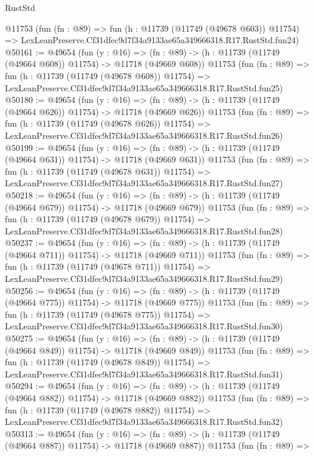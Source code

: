 \begin{lexlean}{RustStd}
\begin{coremodule}
    @11753
    (fun (fn : @89) =>
    fun (h : @11739 (@11749 (@49678 @603)) @11754) =>
    LexLeanPreserve.Cf31dfec9d7f34a9133ae65a349666318.R17.RustStd.fun24)
@50161 := @49654
    (fun (y : @16) =>
    (fn : @89) -> (h : @11739 (@11749 (@49664 @608)) @11754) -> @11718 (@49669 @608))
    @11753
    (fun (fn : @89) =>
    fun (h : @11739 (@11749 (@49678 @608)) @11754) =>
    LexLeanPreserve.Cf31dfec9d7f34a9133ae65a349666318.R17.RustStd.fun25)
@50180 := @49654
    (fun (y : @16) =>
    (fn : @89) -> (h : @11739 (@11749 (@49664 @626)) @11754) -> @11718 (@49669 @626))
    @11753
    (fun (fn : @89) =>
    fun (h : @11739 (@11749 (@49678 @626)) @11754) =>
    LexLeanPreserve.Cf31dfec9d7f34a9133ae65a349666318.R17.RustStd.fun26)
@50199 := @49654
    (fun (y : @16) =>
    (fn : @89) -> (h : @11739 (@11749 (@49664 @631)) @11754) -> @11718 (@49669 @631))
    @11753
    (fun (fn : @89) =>
    fun (h : @11739 (@11749 (@49678 @631)) @11754) =>
    LexLeanPreserve.Cf31dfec9d7f34a9133ae65a349666318.R17.RustStd.fun27)
@50218 := @49654
    (fun (y : @16) =>
    (fn : @89) -> (h : @11739 (@11749 (@49664 @679)) @11754) -> @11718 (@49669 @679))
    @11753
    (fun (fn : @89) =>
    fun (h : @11739 (@11749 (@49678 @679)) @11754) =>
    LexLeanPreserve.Cf31dfec9d7f34a9133ae65a349666318.R17.RustStd.fun28)
@50237 := @49654
    (fun (y : @16) =>
    (fn : @89) -> (h : @11739 (@11749 (@49664 @711)) @11754) -> @11718 (@49669 @711))
    @11753
    (fun (fn : @89) =>
    fun (h : @11739 (@11749 (@49678 @711)) @11754) =>
    LexLeanPreserve.Cf31dfec9d7f34a9133ae65a349666318.R17.RustStd.fun29)
@50256 := @49654
    (fun (y : @16) =>
    (fn : @89) -> (h : @11739 (@11749 (@49664 @775)) @11754) -> @11718 (@49669 @775))
    @11753
    (fun (fn : @89) =>
    fun (h : @11739 (@11749 (@49678 @775)) @11754) =>
    LexLeanPreserve.Cf31dfec9d7f34a9133ae65a349666318.R17.RustStd.fun30)
@50275 := @49654
    (fun (y : @16) =>
    (fn : @89) -> (h : @11739 (@11749 (@49664 @849)) @11754) -> @11718 (@49669 @849))
    @11753
    (fun (fn : @89) =>
    fun (h : @11739 (@11749 (@49678 @849)) @11754) =>
    LexLeanPreserve.Cf31dfec9d7f34a9133ae65a349666318.R17.RustStd.fun31)
@50294 := @49654
    (fun (y : @16) =>
    (fn : @89) -> (h : @11739 (@11749 (@49664 @882)) @11754) -> @11718 (@49669 @882))
    @11753
    (fun (fn : @89) =>
    fun (h : @11739 (@11749 (@49678 @882)) @11754) =>
    LexLeanPreserve.Cf31dfec9d7f34a9133ae65a349666318.R17.RustStd.fun32)
@50313 := @49654
    (fun (y : @16) =>
    (fn : @89) -> (h : @11739 (@11749 (@49664 @887)) @11754) -> @11718 (@49669 @887))
    @11753
    (fun (fn : @89) =>

\end{coremodule}
\end{lexlean}
